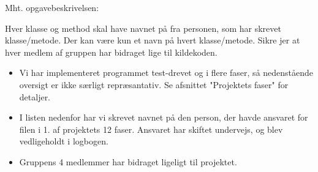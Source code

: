 
Mht.  opgavebeskrivelsen:
\begin{mdframed}[backgroundcolor=black!5]
Hver klasse og method skal have navnet på fra personen, som har skrevet klasse/metode. Der kan være kun et navn på hvert klasse/metode. Sikre jer at hver medlem af gruppen har bidraget lige til kildekoden.
\end{mdframed}

\begin{itemize}
\item Vi har implementeret programmet test-drevet og i flere faser, så nedenstående oversigt er ikke særligt repræsantativ. Se afsnittet "Projektets faser" for detaljer.
\item I listen nedenfor har vi skrevet navnet på den person, der havde ansvaret for filen i 1. af projektets 12 faser. Ansvaret har skiftet undervejs, og blev vedligeholdt i logbogen.
\item Gruppens 4 medlemmer har bidraget ligeligt til projektet.
\end{itemize}
 



